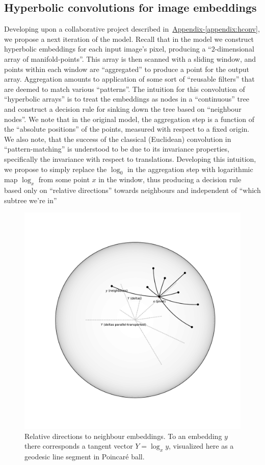 \subsection{Hyperbolic convolutions for image embeddings} \label{sec:hconv}

Developing upon a collaborative project described
in~\hyperref[appendix:hconv]{Appendix-\ref*{appendix:hconv}}, we propose a next
iteration of the model. Recall that in the model we construct hyperbolic
embeddings for each input image's pixel, producing a ``\( 2 \)-dimensional
array of manifold-points''. This array is then scanned with a sliding window,
and points within each window are ``aggregated'' to produce a point for the
output array. Aggregation amounts to application of some sort of ``reusable
filters'' that are deemed to match various ``patterns''. The intuition for this convolution
of ``hyperbolic arrays'' is to treat the embeddings as nodes in a ``continuous'' tree
and construct a decision rule for sinking down the tree based on ``neighbour nodes''.
We note that in the original model, the aggregation step is a function of the
``absolute positions'' of the points, measured with respect to a fixed origin.
We also note, that the success of the classical (Euclidean) convolution in
``pattern-matching'' is understood to be due to its invariance properties,
specifically the invariance with respect to translations. Developing this intuition,
we propose to simply replace the \( \log_0 \) in the aggregation step
with logarithmic map \( \log_x \) from some point \( x \) in the window, thus
producing a decision rule based only on ``relative directions'' towards neighbours
and independent of ``which subtree we're in''

\begin{figure}[ht]\center
\includegraphics[width=.5\textwidth]{art/neighbours.pdf}
\caption{Relative directions to neighbour embeddings. To an embedding \( y \)
there corresponds a tangent vector \( Y = \log_x y \), visualized here as a
geodesic line segment in Poincar\'e ball.}
\end{figure}

